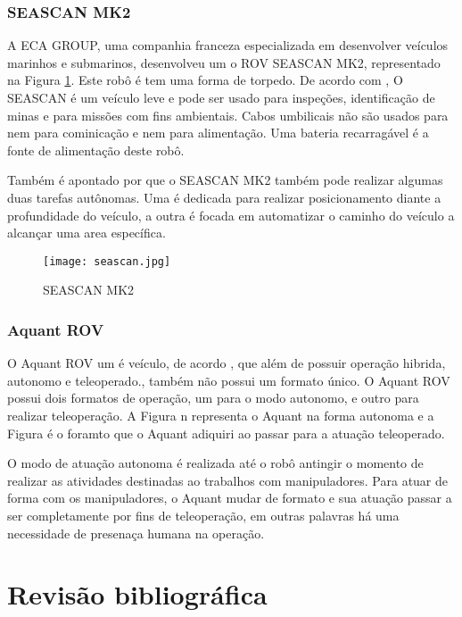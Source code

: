 \subsubsection{SEASCAN MK2}


A ECA GROUP, uma companhia franceza especializada em desenvolver veículos marinhos e submarinos, desenvolveu um o ROV SEASCAN MK2, representado na Figura \ref{fig:seascan}. Este robô é tem uma forma de torpedo. De acordo com \cite{ECA_GROUP}, O SEASCAN é um veículo leve e pode ser usado para inspeções, identificação de minas e para missões com fins ambientais. Cabos umbilicais não são usados para nem para cominicação e nem para alimentação.  Uma bateria recarragável é a fonte de alimentação deste robô.

Também é apontado por \cite{ECA_GROUP} que o SEASCAN MK2 também pode realizar algumas duas tarefas autônomas. Uma é dedicada para realizar posicionamento diante a profundidade do veículo, a outra é focada em automatizar o caminho do veículo a alcançar uma area específica.



\begin{figure}
  \centering 
  \texttt{[image: seascan.jpg]}
  \caption{SEASCAN MK2}
  \label{fig:seascan}
\end{figure}


\subsubsection{Aquant ROV}

O Aquant ROV um é veículo, de acordo \cite{Bogue1}, que além de possuir operação hibrida, autonomo e teleoperado., também não possui um formato único. O Aquant ROV possui dois formatos de operação, um para o modo autonomo, e outro para realizar teleoperação.
A Figura n representa o Aquant na forma autonoma e  a Figura é o foramto que o Aquant adiquiri ao passar para a atuação teleoperado.

O modo de atuação autonoma é realizada até o robô antingir o momento de realizar as atividades destinadas ao trabalhos com manipuladores. Para atuar de forma com os manipuladores, o Aquant mudar de formato e sua atuação passar a ser completamente por fins de teleoperação, em outras palavras há uma necessidade de presenaça  humana na operação. 



\section{Revisão bibliográfica}
